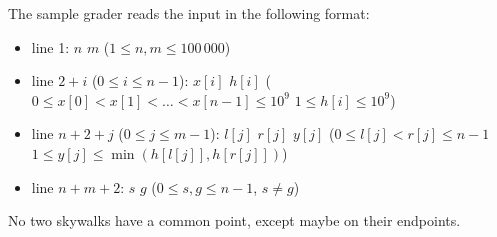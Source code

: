 The sample grader reads the input in the following format:
\begin{itemize}
\item line 1:  $n$ $m$ ($1 \leq n, m \leq  100\,000$)
\item line $2 + i$ ($0 \leq i \leq n - 1$):  $x[i]$ $h[i]$ ($0 \leq x[0] < x[1] < \ldots < x[n - 1] \leq 10^9$ $1 \leq h[i] \leq 10^9$)
\item line $n + 2 + j$ ($0 \leq j \leq m - 1$):  $l[j]$ $r[j]$ $y[j]$ ($0 \leq l[j] < r[j] \leq n-1$ $1 \leq y[j] \leq \min(h[l[j]], h[r[j]])$)
\item line $n + m + 2$: $s$ $g$ ($0 \leq s, g \leq  n - 1$, $s \neq g$)
\end{itemize}

No two skywalks have a common point, except maybe on their endpoints.